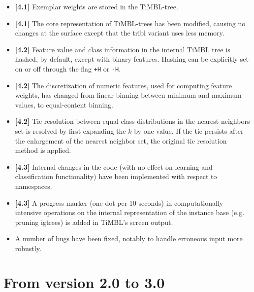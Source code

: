 \documentclass{report}
\begin{document}
\begin{itemize}
\item {\bf [4.1]} Exemplar weights are stored in the TiMBL-tree.

\item {\bf [4.1]} The core representation of
TiMBL-trees has been modified, causing no changes at the surface
except that the {\sc tribl} variant uses less memory.

\item {\bf [4.2]} Feature value and class information in the internal
TiMBL tree is hashed, by default, except with binary features. Hashing
can be explicitly set on or off through the flag {\tt +H} or {\tt -H}.

\item {\bf [4.2]} The discretization of numeric
features, used for computing feature weights, has changed from linear
binning between minimum and maximum values, to equal-content binning.

\item {\bf [4.2]} Tie resolution between equal
class distributions in the nearest neighbors set is resolved by first
expanding the $k$ by one value. If the tie persists after the
enlargement of the nearest neighbor set, the original tie resolution
method is applied.

\item {\bf [4.3]} Internal changes in the code (with no effect on
learning and classification functionality) have been implemented with
respect to namespaces.

\item {\bf [4.3]} A progress marker (one dot per 10 seconds) in
computationally intensive operations on the internal representation of
the instance base (e.g. pruning {\sc igtree}s) is added in TiMBL's
screen output.

\item A number of bugs have been fixed, notably to handle erroneous
input more robustly.

\end{itemize}

\section{From version 2.0 to 3.0}
\end{document}
